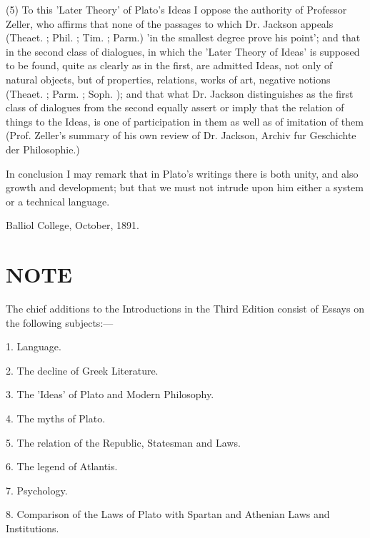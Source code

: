 \documentclass[11pt,letter]{article}
\begin{document}
\par  (5) To this 'Later Theory' of Plato's Ideas I oppose the authority of Professor Zeller, who affirms that none of the passages to which Dr. Jackson appeals (Theaet. ; Phil. ; Tim. ; Parm.) 'in the smallest degree prove his point'; and that in the second class of dialogues, in which the 'Later Theory of Ideas' is supposed to be found, quite as clearly as in the first, are admitted Ideas, not only of natural objects, but of properties, relations, works of art, negative notions (Theaet. ; Parm. ; Soph. ); and that what Dr. Jackson distinguishes as the first class of dialogues from the second equally assert or imply that the relation of things to the Ideas, is one of participation in them as well as of imitation of them (Prof. Zeller's summary of his own review of Dr. Jackson, Archiv fur Geschichte der Philosophie.)

\par  In conclusion I may remark that in Plato's writings there is both unity, and also growth and development; but that we must not intrude upon him either a system or a technical language.

\par  Balliol College, October, 1891.

\par 
\section{
      NOTE
    }
\par  The chief additions to the Introductions in the Third Edition consist of Essays on the following subjects:—

\par  1. Language.

\par  2. The decline of Greek Literature.

\par  3. The 'Ideas' of Plato and Modern Philosophy.

\par  4. The myths of Plato.

\par  5. The relation of the Republic, Statesman and Laws.

\par  6. The legend of Atlantis.

\par  7. Psychology.

\par  8. Comparison of the Laws of Plato with Spartan and Athenian Laws and Institutions.
\end{document}
